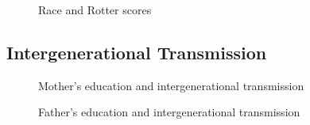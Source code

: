 \begin{figure}[htp]\centering
\caption{Race and Rotter scores}
\end{figure}
\FloatBarrier\subsection{Intergenerational Transmission}
\begin{figure}[htp]\centering
\caption{Mother's education and intergenerational transmission}
\end{figure}

\begin{figure}[htp]\centering
\caption{Father's education and intergenerational transmission}
\end{figure}
